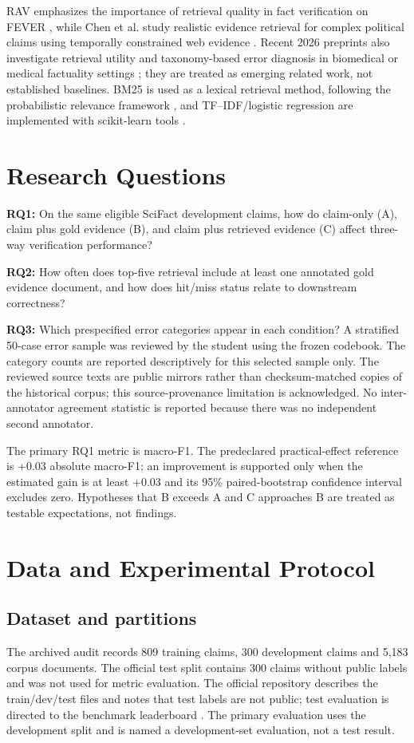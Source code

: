 \documentclass[10pt]{article}
\begin{document}
RAV emphasizes the importance of retrieval quality in fact verification on FEVER \citep{zheng2024rav}, while Chen et al. study realistic evidence retrieval for complex political claims using temporally constrained web evidence \citep{chen2024complex}. Recent 2026 preprints also investigate retrieval utility and taxonomy-based error diagnosis in biomedical or medical factuality settings \citep{deka2026retrieval,huang2026taxonomy}; they are treated as emerging related work, not established baselines. BM25 is used as a lexical retrieval method, following the probabilistic relevance framework \citep{robertson2009bm25}, and TF--IDF/logistic regression are implemented with scikit-learn tools \citep{pedregosa2011sklearn}.

\section{Research Questions}
\textbf{RQ1:} On the same eligible SciFact development claims, how do claim-only (A), claim plus gold evidence (B), and claim plus retrieved evidence (C) affect three-way verification performance?

\textbf{RQ2:} How often does top-five retrieval include at least one annotated gold evidence document, and how does hit/miss status relate to downstream correctness?

\textbf{RQ3:} Which prespecified error categories appear in each condition? A stratified 50-case error sample was reviewed by the student using the frozen codebook. The category counts are reported descriptively for this selected sample only. The reviewed source texts are public mirrors rather than checksum-matched copies of the historical corpus; this source-provenance limitation is acknowledged. No inter-annotator agreement statistic is reported because there was no independent second annotator.

The primary RQ1 metric is macro-F1. The predeclared practical-effect reference is +0.03 absolute macro-F1; an improvement is supported only when the estimated gain is at least +0.03 and its 95\% paired-bootstrap confidence interval excludes zero. Hypotheses that B exceeds A and C approaches B are treated as testable expectations, not findings.

\section{Data and Experimental Protocol}
\subsection{Dataset and partitions}
The archived audit records 809 training claims, 300 development claims and 5,183 corpus documents. The official test split contains 300 claims without public labels and was not used for metric evaluation. The official repository describes the train/dev/test files and notes that test labels are not public; test evaluation is directed to the benchmark leaderboard \citep{wadden2020fact}. The primary evaluation uses the development split and is named a development-set evaluation, not a test result.
\end{document}

